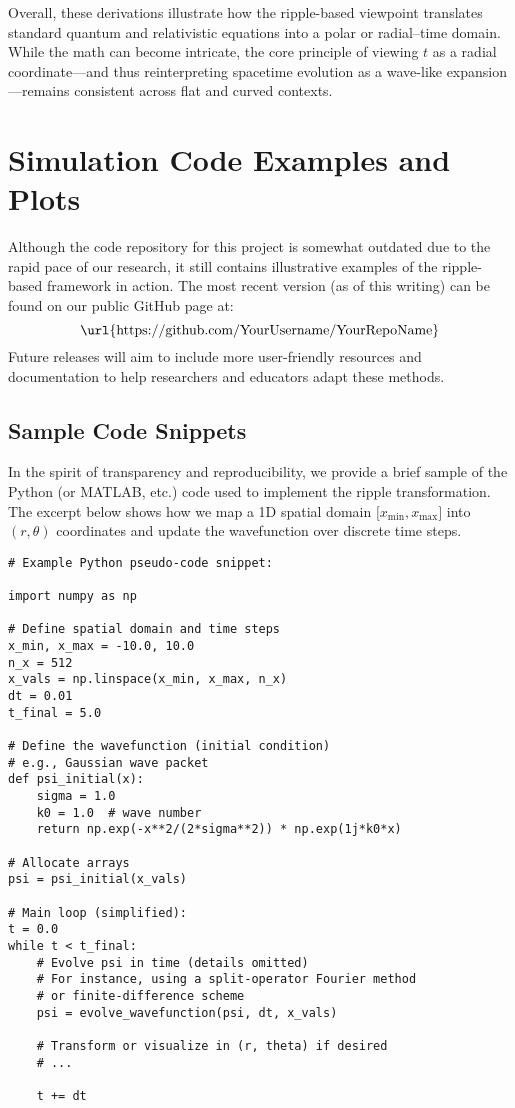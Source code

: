 \documentclass[11pt]{article}
\begin{document}
\bigskip

\noindent
Overall, these derivations illustrate how the ripple-based viewpoint 
translates standard quantum and relativistic equations into a polar 
or radial--time domain. While the math can become intricate, the core 
principle of viewing $t$ as a radial coordinate---and thus reinterpreting 
spacetime evolution as a wave-like expansion---remains consistent across 
flat and curved contexts.


\section{Simulation Code Examples and Plots}
\label{app:sim-code}

Although the code repository for this project is somewhat outdated due 
to the rapid pace of our research, it still contains illustrative examples 
of the ripple-based framework in action. The most recent version (as of 
this writing) can be found on our public GitHub page at:
\[
  \text{\url{https://github.com/YourUsername/YourRepoName}}
\]
Future releases will aim to include more user-friendly resources and 
documentation to help researchers and educators adapt these methods.

\subsection{Sample Code Snippets}
\label{app:subsec:code-snippets}
In the spirit of transparency and reproducibility, we provide a brief 
sample of the Python (or MATLAB, etc.) code used to implement the 
ripple transformation. The excerpt below shows how we map a 
1D spatial domain \(\bigl[x_{\min}, x_{\max}\bigr]\) into \((r, \theta)\) 
coordinates and update the wavefunction over discrete time steps.

\begin{verbatim}
# Example Python pseudo-code snippet:

import numpy as np

# Define spatial domain and time steps
x_min, x_max = -10.0, 10.0
n_x = 512
x_vals = np.linspace(x_min, x_max, n_x)
dt = 0.01
t_final = 5.0

# Define the wavefunction (initial condition) 
# e.g., Gaussian wave packet
def psi_initial(x):
    sigma = 1.0
    k0 = 1.0  # wave number
    return np.exp(-x**2/(2*sigma**2)) * np.exp(1j*k0*x)

# Allocate arrays
psi = psi_initial(x_vals)

# Main loop (simplified):
t = 0.0
while t < t_final:
    # Evolve psi in time (details omitted)
    # For instance, using a split-operator Fourier method
    # or finite-difference scheme
    psi = evolve_wavefunction(psi, dt, x_vals)

    # Transform or visualize in (r, theta) if desired
    # ...
    
    t += dt
\end{verbatim}
\end{document}
